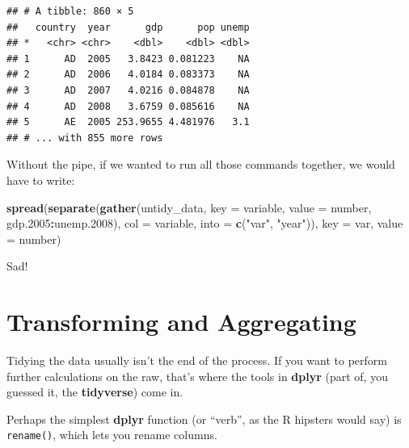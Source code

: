 \documentclass[12pt,oneside,openany]{book}
\newenvironment{Shaded}{\begin{snugshade}}{\end{snugshade}}
\newcommand{\KeywordTok}[1]{\textcolor[rgb]{0.13,0.29,0.53}{\textbf{#1}}}
\newcommand{\DataTypeTok}[1]{\textcolor[rgb]{0.13,0.29,0.53}{#1}}
\newcommand{\DecValTok}[1]{\textcolor[rgb]{0.00,0.00,0.81}{#1}}
\newcommand{\StringTok}[1]{\textcolor[rgb]{0.31,0.60,0.02}{#1}}
\newcommand{\OperatorTok}[1]{\textcolor[rgb]{0.81,0.36,0.00}{\textbf{#1}}}
\newcommand{\NormalTok}[1]{#1}
\begin{document}
\begin{verbatim}
## # A tibble: 860 × 5
##   country  year      gdp      pop unemp
## *   <chr> <chr>    <dbl>    <dbl> <dbl>
## 1      AD  2005   3.8423 0.081223    NA
## 2      AD  2006   4.0184 0.083373    NA
## 3      AD  2007   4.0216 0.084878    NA
## 4      AD  2008   3.6759 0.085616    NA
## 5      AE  2005 253.9655 4.481976   3.1
## # ... with 855 more rows
\end{verbatim}

Without the pipe, if we wanted to run all those commands together, we
would have to write:

\begin{Shaded}
\begin{Highlighting}[]
\KeywordTok{spread}\NormalTok{(}\KeywordTok{separate}\NormalTok{(}\KeywordTok{gather}\NormalTok{(untidy_data,}
                       \DataTypeTok{key =}\NormalTok{ variable,}
                       \DataTypeTok{value =}\NormalTok{ number,}
\NormalTok{                       gdp.}\DecValTok{2005}\OperatorTok{:}\NormalTok{unemp.}\DecValTok{2008}\NormalTok{),}
                \DataTypeTok{col =}\NormalTok{ variable,}
                \DataTypeTok{into =} \KeywordTok{c}\NormalTok{(}\StringTok{"var"}\NormalTok{, }\StringTok{"year"}\NormalTok{)),}
       \DataTypeTok{key =}\NormalTok{ var,}
       \DataTypeTok{value =}\NormalTok{ number)}
\end{Highlighting}
\end{Shaded}

Sad!

\section{Transforming and
Aggregating}\label{transforming-and-aggregating}

Tidying the data usually isn't the end of the process. If you want to
perform further calculations on the raw, that's where the tools in
\textbf{dplyr} (part of, you guessed it, the \textbf{tidyverse}) come
in.

Perhaps the simplest \textbf{dplyr} function (or ``verb'', as the R
hipsters would say) is \texttt{rename()}, which lets you rename columns.

\begin{Shaded}
\end{Shaded}
\end{document}
